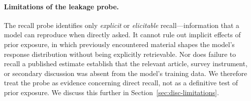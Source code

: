 \documentclass[12pt]{article}
\begin{document}
\paragraph{Limitations of the leakage probe.} The recall probe identifies only \emph{explicit} or \emph{elicitable}
recall---information that a model can reproduce when directly asked. It
cannot rule out implicit effects of prior exposure, in which previously
encountered material shapes the model's response distribution without
being explicitly retrievable. Nor does failure to recall a published
estimate establish that the relevant article, survey instrument, or
secondary discussion was absent from the model's training data. We
therefore treat the probe as evidence concerning direct recall, not as a
definitive test of prior exposure. We discuss this further in Section~\ref{sec:disc-limitations}.
\end{document}
